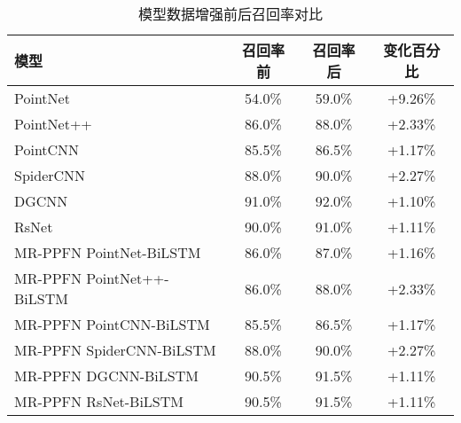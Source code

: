 \begin{table}[htbp]
    \ContinuedFloat
    \centering

    \begin{subtable}{\linewidth}
        \centering
        \caption{模型数据增强前后召回率对比}
        \begin{tabular}{lc|cc}
            \toprule
            \textbf{模型} & \textbf{召回率前} & \textbf{召回率后} & \textbf{变化百分比} \\
            \midrule
            PointNet & 54.0\% & 59.0\% & +9.26\% \\
            PointNet++ & 86.0\% & 88.0\% & +2.33\% \\
            PointCNN & 85.5\% & 86.5\% & +1.17\% \\
            SpiderCNN & 88.0\% & 90.0\% & +2.27\% \\
            DGCNN & 91.0\% & 92.0\% & +1.10\% \\
            RsNet & 90.0\% & 91.0\% & +1.11\% \\
            MR-PPFN PointNet-BiLSTM & 86.0\% & 87.0\% & +1.16\% \\
            MR-PPFN PointNet++-BiLSTM & 86.0\% & 88.0\% & +2.33\% \\
            MR-PPFN PointCNN-BiLSTM & 85.5\% & 86.5\% & +1.17\% \\
            MR-PPFN SpiderCNN-BiLSTM & 88.0\% & 90.0\% & +2.27\% \\
            MR-PPFN DGCNN-BiLSTM & 90.5\% & 91.5\% & +1.11\% \\
            MR-PPFN RsNet-BiLSTM & 90.5\% & 91.5\% & +1.11\% \\
            \bottomrule
        \end{tabular}
        \label{tab:recall-comparison}
    \end{subtable}

    \vspace{0.4cm}


\end{table}
